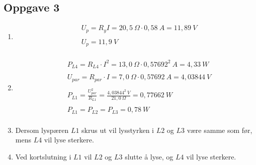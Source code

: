 \documentclass[11pt,a4paper]{report}
\newcommand{\opg}[1]{\subsection*{Oppgave #1}}
\newcommand{\opgd}[1]{\item[#1)]}
\begin{document}
\opg{3}
\begin{enumerate}[leftmargin=*,itemsep=2cm,labelsep=2em,label=\alph*)]
\opgd{c}
\begin{align*}
&U_p = R_y I = 20,5\ \Omega \cdot 0,58\ A = 11,89\ V\\\\
&U_p = 11,9\ V\\
\end{align*}


\opgd{d}
\begin{align*}
&P_{L4} = R_{L4} \cdot I^2 = 13,0\ \Omega \cdot 0,57692^2\ A = 4,33\ W\\\\
&U_{par} = R_{par} \cdot I = 7,0\ \Omega \cdot 0,57692\ A = 4,03844\ V\\\\
&P_{L1} = \frac{U_{par}^2}{R_{L1}} = \frac{4,03844^2\ V}{21,0\ \Omega} = 0,77662\ W\\\\
&P_{L1} = P_{L2} = P_{L3} = 0,78\ W\\
\end{align*}


\opgd{e}
Dersom lyspæren $L1$ skrus ut vil lysstyrken i $L2$ og $L3$ være samme som før, mens $L4$ vil lyse sterkere.

\opgd{f}
Ved kortslutning i $L1$ vil $L2$ og $L3$ slutte å lyse, og $L4$ vil lyse sterkere.

\end{enumerate}
\end{document}

